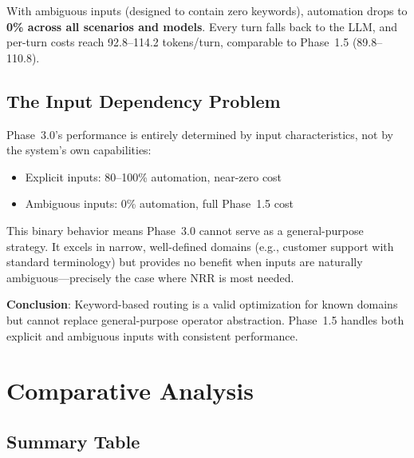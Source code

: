 \documentclass[11pt,a4paper]{article}
\begin{document}
With ambiguous inputs (designed to contain zero keywords), automation drops to
\textbf{0\% across all scenarios and models}. Every turn falls back to the LLM,
and per-turn costs reach 92.8--114.2 tokens/turn, comparable to Phase~1.5
(89.8--110.8).

\subsection{The Input Dependency Problem}

Phase~3.0's performance is entirely determined by input characteristics, not by
the system's own capabilities:

\begin{itemize}
    \item Explicit inputs: 80--100\% automation, near-zero cost
    \item Ambiguous inputs: 0\% automation, full Phase~1.5 cost
\end{itemize}

This binary behavior means Phase~3.0 cannot serve as a general-purpose strategy.
It excels in narrow, well-defined domains (e.g., customer support with standard
terminology) but provides no benefit when inputs are naturally ambiguous---precisely
the case where NRR is most needed.

\textbf{Conclusion}: Keyword-based routing is a valid optimization for known
domains but cannot replace general-purpose operator abstraction. Phase~1.5
handles both explicit and ambiguous inputs with consistent performance.

\section{Comparative Analysis}
\label{sec:comparative}

\subsection{Summary Table}
\end{document}
